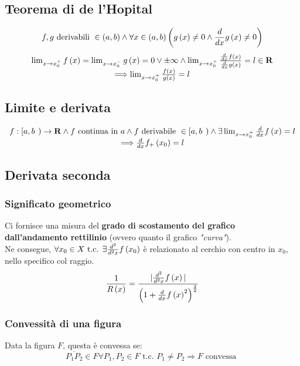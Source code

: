 \documentclass{report}
\begin{document}
    \subsection{Teorema di de l'Hopital}
        $$f, g \textrm{ derivabili } \in \left(a, b\right) \wedge \forall x \in \left(a, b\right) \left(g\left(x\right) \neq 0 \wedge \D{x}g\left(x\right) \neq 0\right)$$
        $$\begin{array}{c}
            \lim_{x \to x_0^+} f\left(x\right) = \lim_{x \to x_0^-} g\left(x\right) = 0 \vee 
                \pm \infty \wedge \lim_{x \to x_0^+}\frac{\D{x}f\left(x\right)}{\D{x}g\left(x\right)} = l \in \mathbf{R} \\
                \Longrightarrow \lim_{x \to x_0^+} \frac{f\left(x\right)}{g\left(x\right)} = l
        \end{array}$$
    \subsection{Limite e derivata}
        $$\begin{array}{c}
            f: \left[a, b\right.\left.\right) \rightarrow \mathbf{R} \wedge f \textrm{ continua in } a 
                \wedge f \textrm{ derivabile } \in \left[a, b\right.\left.\right) \wedge \exists \lim_{x \to x_0^+} \D{x}f\left(x\right) = l \\
            \Longrightarrow \D{x}f_+\left(x_0\right) = l
        \end{array}$$
    \subsection{Derivata seconda}
        \subsubsection{Significato geometrico}
            Ci fornisce una misura del \textbf{grado di scostamento del grafico dall'andamento rettilinio}
            (ovvero quanto il grafico \textit{"curva"}). \\
            Ne consegue, $\forall x_0 \in X \textrm{ t.c. } \exists \D{x}{2}f\left(x_0\right)$ è relazionato 
            al cerchio con centro in $x_0$, nello specifico col raggio. \\
            $$\frac{1}{R\left(x\right)} = \frac{|\D{x}{2}f\left(x\right)|}{\left(1 + \D{x}f\left(x\right)^2\right)^{\frac{3}{2}}}$$
        \subsubsection{Convessità di una figura} 
            Data la figura $F$, questa è convessa se:
            $$\overline{P_1P_2} \in F \forall P_1, P_2 \in F \textrm{ t.c. } P_1 \neq P_2 \Longrightarrow F \textrm{ convessa }$$
\end{document}
